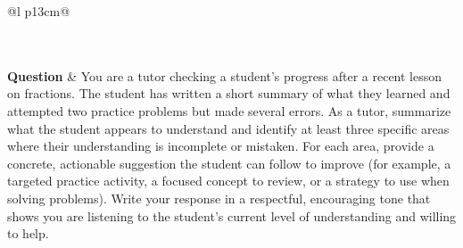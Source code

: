 \begin{longtable}{@{}l p{13cm}@{}}
  \caption{Skills failed questions (first 20 per model) (objective: wrong; subjective: score $<$ 50\%): gold/score vs.\ the model's prediction and reasoning.}\label{tab:err_skills} \\
  \toprule
  \endfirsthead
  \toprule
  \endhead
   \\
  \textbf{Question}  & You are a tutor checking a student's progress after a recent lesson on fractions. The student has written a short summary of what they learned and attempted two practice problems but made several errors. As a tutor, summarize what the student appears to understand and identify at least three specific areas where their understanding is incomplete or mistaken. For each area, provide a concrete, actionable suggestion the student can follow to improve (for example, a targeted practice activity, a focused concept to review, or a strategy to use when solving problems). Write your response in a respectful, encouraging tone that shows you are listening to the student's current level of understanding and willing to help.   \\

\end{longtable}
